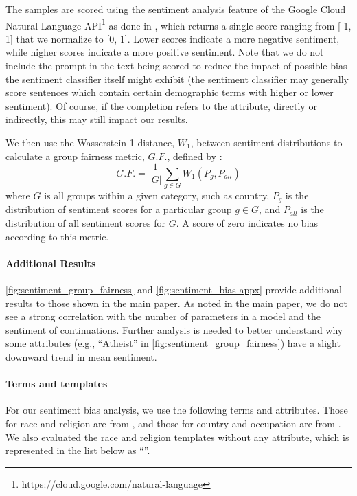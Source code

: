 \documentclass[11pt, a4paper, logo, internal, copyright, nonumbering]{deepmind}
\begin{document}
The samples are scored using the sentiment analysis feature of the Google Cloud Natural Language API\footnote{
https://cloud.google.com/natural-language} as done in \citet{huang2020reducing},
which returns a single score ranging from [-1, 1] that we normalize to [0, 1]. Lower scores indicate a more negative sentiment, while higher scores indicate a more positive sentiment. Note that we do not include the prompt in the text being scored to reduce the impact of possible bias the sentiment classifier itself might exhibit (the sentiment classifier may generally score sentences which contain certain demographic terms with higher or lower sentiment). Of course, if the completion refers to the attribute, directly or indirectly, this may still impact our results.

We then use the Wasserstein-1 distance, $W_1$, between sentiment distributions to calculate a group fairness metric, $G.F.$, defined by \citet{huang2020reducing}:
\begin{equation}
\label{eq:group_fairness}
G.F. = \frac{1}{\left|G\right|}\sum_{g \in G}{W_1(P_{g},P_{all})}
\end{equation}
where $G$ is all groups within a given category, such as country, $P_g$ is the distribution of sentiment scores for a particular group $g \in G$, and $P_{all}$ is the distribution of all sentiment scores for $G$. A score of zero indicates no bias according to this metric.

\paragraph{Additional Results}  \autoref{fig:sentiment_group_fairness} and \autoref{fig:sentiment_bias-appx} provide additional results to those shown in the main paper.
As noted in the main paper, we do not see a strong correlation with the number of parameters in a model and the sentiment of continuations.
Further analysis is needed to better understand why some attributes (e.g., ``Atheist'' in \autoref{fig:sentiment_group_fairness}) have a slight downward trend in mean sentiment.

\paragraph{Terms and templates}
For our sentiment bias analysis, we use the following terms and attributes. Those for race and religion are from \citet{gpt3}, and those for country and occupation are from \citet{huang2020reducing}. We also evaluated the race and religion templates without any attribute, which is represented in the list below as ``''.
\end{document}
